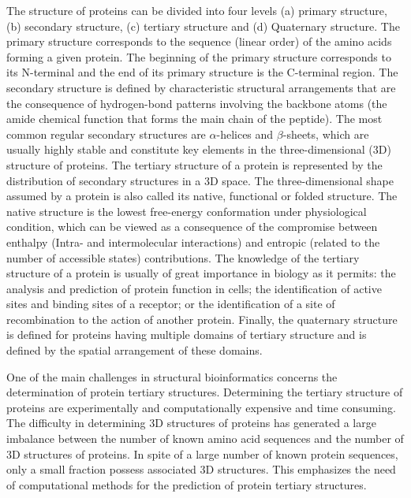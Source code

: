 The structure of proteins can be divided into four levels\cite{1}\cite{2}  (a) primary structure, (b) secondary structure, (c) tertiary structure and (d) Quaternary structure. The primary structure corresponds to the sequence (linear order) of the amino acids forming a given protein\cite{1}\cite{2}\cite{4}\cite{5}. The beginning of the primary structure corresponds to its N-terminal and the end of its primary structure is the C-terminal region. The secondary structure is defined by characteristic structural arrangements that are the consequence of hydrogen-bond patterns involving the backbone atoms (the amide chemical function that forms the main chain of the peptide)\cite{2}. The most common regular secondary structures are $\alpha$-helices and $\beta$-sheets\cite{6}, which are usually highly stable and constitute key elements in the three-dimensional (3D) structure of proteins. The tertiary structure of a protein is represented by the distribution of secondary structures in a 3D space. 
\newpage
The three-dimensional shape assumed by a protein is also called its native, functional or folded structure. The native structure is the lowest free-energy conformation under physiological condition, which can be viewed as a consequence of the compromise between enthalpy (Intra- and intermolecular interactions) and entropic (related to the number of accessible states) contributions\cite{1}\cite{2}\cite{4}\cite{7}. The knowledge of the tertiary structure of a protein is usually of great importance in biology as it permits: the analysis and prediction of protein function in cells; the identification of active sites and binding sites of a receptor; or the identification of a site of recombination to the action of another protein\cite{2}. Finally, the quaternary structure is defined for proteins having multiple domains of tertiary structure and is defined by the spatial arrangement of these domains.

One of the main challenges in structural bioinformatics concerns the determination of protein tertiary structures. Determining the tertiary structure of proteins are experimentally and computationally expensive and time consuming\cite{8}. The difficulty in determining 3D structures of proteins has generated a large imbalance between the number of known amino acid sequences and the number of 3D structures of proteins. In spite of a large number of known protein sequences, only a small fraction possess associated 3D structures. This emphasizes the need of computational methods for the prediction of protein tertiary structures.


